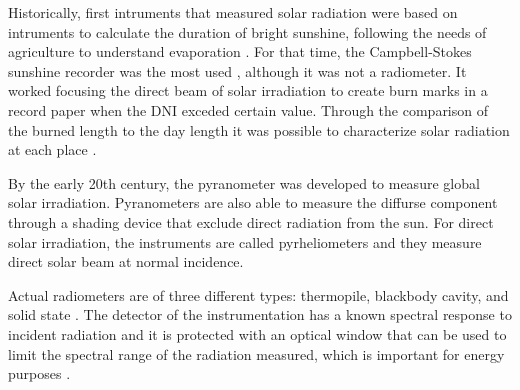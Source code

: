 Historically, first intruments that measured solar radiation were based on intruments to calculate the duration of bright sunshine, following the needs of agriculture to understand evaporation \cite*{sengupta2017best}. For that time, the Campbell-Stokes sunshine recorder was the most used \cite*{sengupta2017best}, although it was not a radiometer. It worked focusing the direct beam of solar irradiation to create burn marks in a record paper when the DNI exceded certain value. Through the comparison of the burned length to the day length it was possible to characterize solar radiation at each place \cite*{Iqbal2012Introduction}.

By the early 20th century, the pyranometer was developed to measure global solar irradiation. Pyranometers are also able to measure the diffurse component through a shading device that exclude direct radiation from the sun. For direct solar irradiation, the instruments are called pyrheliometers and they measure direct solar beam at normal incidence.
 
Actual radiometers are of three different types: thermopile, blackbody cavity, and solid state \cite*{Gueymard2008}. The detector of the instrumentation has a known spectral response to incident radiation and it is protected with an optical window that can be used to limit the spectral range of the radiation measured, which is important for energy purposes \cite*{Gueymard2008}. 



